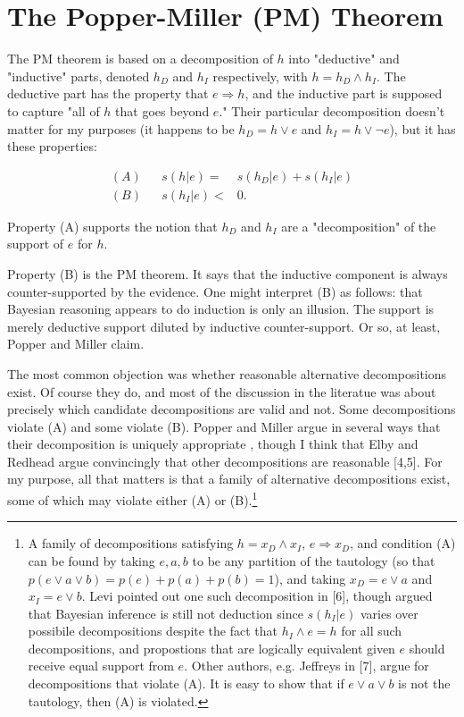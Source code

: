\documentclass[twoside,11pt]{article}
\numberwithin{equation}{section}
\begin{document}
\section{The Popper-Miller (PM) Theorem}

The PM theorem is based on a decomposition of $h$ into "deductive"
and "inductive" parts, denoted $h_D$ and $h_I$ respectively,
with $h = h_D \land h_I$.  The
deductive part has the property that $e \Rightarrow h$, and
the inductive part is supposed to capture "all of $h$ that goes beyond
$e$."  Their particular decomposition doesn't matter for my purposes
(it happens to be $h_D = h \lor e$ and $h_I = h \lor \lnot e$), but
it has these properties:

\begin{align}
(A) && s(h | e) ={}& s(h_D | e) + s(h_I | e) \\
(B) && s(h_I | e) <{}& 0.
\end{align}

Property (A) supports the notion that $h_D$ and $h_I$ are a "decomposition"
of the support of $e$ for $h$.

Property (B) is the PM theorem.  It says that the inductive component is always
counter-supported by the evidence.  One might interpret (B) as follows: that
Bayesian reasoning appears to do induction is only an illusion. The support is
merely deductive support diluted by inductive counter-support. Or so, at least,
Popper and Miller claim.

The most common objection was whether reasonable alternative decompositions
exist.  Of course they do, and most of the discussion  in the literatue was
about precisely which candidate decompositions are valid and not. Some
decompositions violate (A) and some violate (B).  Popper and Miller argue in
several ways that their decomposition is uniquely appropriate
\citep{popper:1987:probabilistic}, though I think that Elby and Redhead argue
convincingly that other decompositions are reasonable [4,5]. For my purpose, all
that matters is that a family of alternative decompositions exist, some of which
may violate either (A) or (B).\footnote{A family of decompositions satisfying $h
= x_D \land x_I$, $e \Rightarrow x_D$, and condition (A) can be found by taking
${e, a, b}$ to be any partition of the tautology (so that $p(e \lor a \lor b) =
p(e) + p(a) + p(b) = 1$), and taking $x_D = e \lor a$ and $x_I = e \lor b$.
Levi pointed out one such decomposition in [6], though argued that Bayesian
inference is still not deduction since $s(h_I | e)$ varies over possibile
decompositions despite the fact that $h_I \land e = h$ for all such
decompositions, and propostions that are logically equivalent given $e$ should
receive equal support from $e$.  Other authors, e.g. Jeffreys in [7], argue for
decompositions that violate (A).  It is easy to show that if $e \lor a \lor b$
is not the tautology, then (A) is violated.}
\end{document}
